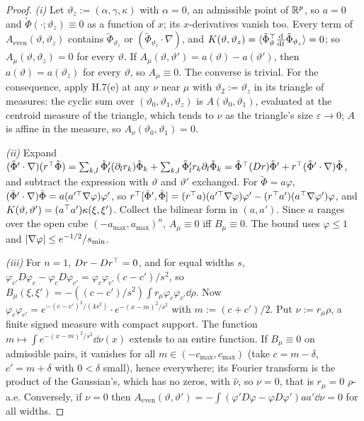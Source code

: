 \begin{proof}
\emph{(i)} Let $\vartheta_z:=(\alpha,\gamma,\kappa)$ with $\alpha=0$, an admissible point of $\mathbb{R}^p$, so $a=0$ and
$\tilde\Phi(\cdot;\vartheta_z)\equiv0$ as a function of $x$; its $x$-derivatives vanish too. Every term of
$A_{\mathrm{even}}(\vartheta,\vartheta_z)$ contains $\tilde\Phi_{\vartheta_z}$ or $(\tilde\Phi_{\vartheta_z}\cdot\nabla)$,
and $K(\vartheta,\vartheta_z)=\langle\tilde\Phi_\vartheta^\top\frac{\mathrm{d}}{\mathrm{d}t}\tilde\Phi_{\vartheta_z}\rangle=0$;
so $A_\mu(\vartheta,\vartheta_z)=0$ for every $\vartheta$. If $A_\mu(\vartheta,\vartheta')=a(\vartheta)-a(\vartheta')$,
then $a(\vartheta)=a(\vartheta_z)$ for every $\vartheta$, so $A_\mu\equiv0$. The converse is trivial. For the
consequence, apply H.7(e) at any $\nu$ near $\mu$ with $\vartheta_2:=\vartheta_z$ in its triangle of measures: the
cyclic sum over $(\vartheta_0,\vartheta_1,\vartheta_z)$ is $A(\vartheta_0,\vartheta_1)$, evaluated at the centroid
measure of the triangle, which tends to $\nu$ as the triangle's size $\varepsilon\to0$; $A$ is affine in the measure,
so $A_\nu(\vartheta_0,\vartheta_1)=0$.

\noindent\emph{(ii)} Expand
$(\tilde\Phi'\cdot\nabla)(r^\top\tilde\Phi)=\sum_{k,l}\tilde\Phi'_l(\partial_lr_k)\tilde\Phi_k
+\sum_{k,l}\tilde\Phi'_lr_k\partial_l\tilde\Phi_k=\tilde\Phi^\top(Dr)\tilde\Phi'+r^\top(\tilde\Phi'\cdot\nabla)\tilde\Phi$,
and subtract the expression with $\vartheta$ and $\vartheta'$ exchanged. For $\tilde\Phi=a\varphi$,
$(\tilde\Phi'\cdot\nabla)\tilde\Phi=a(a'^\top\nabla\varphi)\varphi'$, so
$r^\top[\tilde\Phi',\tilde\Phi]=(r^\top a)(a'^\top\nabla\varphi)\varphi'-(r^\top a')(a^\top\nabla\varphi')\varphi$, and
$K(\vartheta,\vartheta')=(a^\top a')\kappa(\xi,\xi')$. Collect the bilinear form in $(a,a')$. Since $a$ ranges over the
open cube $(-a_{\max},a_{\max})^n$, $A_\mu\equiv0$ iff $B_\mu\equiv0$. The bound uses $\varphi\le1$ and
$\lvert \nabla\varphi\rvert\le e^{-1/2}/s_{\min}$.

\noindent\emph{(iii)} For $n=1$, $Dr-Dr^\top=0$, and for equal widths $s$,
$\varphi_{c'}D\varphi_c-\varphi_cD\varphi_{c'}=\varphi_c\varphi_{c'}(c-c')/s^2$, so
$B_\mu(\xi,\xi')=-((c-c')/s^2)\int r_\mu\varphi_c\varphi_{c'}\dd\rho$. Now
$\varphi_c\varphi_{c'}=e^{-(c-c')^2/(4s^2)}\cdot e^{-(x-m)^2/s^2}$ with $m:=(c+c')/2$. Put $\nu:=r_\mu\rho$, a finite
signed measure with compact support. The function $m\mapsto\int e^{-(x-m)^2/s^2}\dd\nu(x)$ extends to an entire
function. If $B_\mu\equiv0$ on admissible pairs, it vanishes for all $m\in(-c_{\max},c_{\max})$ (take $c=m-\delta$,
$c'=m+\delta$ with $0<\delta$ small), hence everywhere; its Fourier transform is the product of the Gaussian's, which
has no zeros, with $\hat\nu$, so $\nu=0$, that is $r_\mu=0$ $\rho$-a.e. Conversely, if $\nu=0$ then
$A_{\mathrm{even}}(\vartheta,\vartheta')=-\int(\varphi'D\varphi-\varphi D\varphi')aa'\dd\nu=0$ for all widths.


\end{proof}
